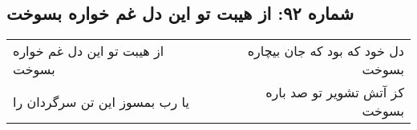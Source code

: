 \begin{center}
\section*{شماره ۹۲: از هیبت تو این دل غم خواره بسوخت}
\label{sec:092}
\begin{longtable}{l p{0.5cm} r}
از هیبت تو این دل غم خواره بسوخت
&&
دل خود که بود که جان بیچاره بسوخت
\\
یا رب بمسوز این تن سرگردان را
&&
کز آتش تشویر تو صد باره بسوخت
\\
\end{longtable}
\end{center}
